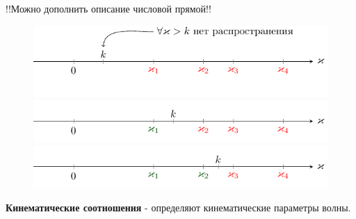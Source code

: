 !!Можно дополнить описание числовой прямой!!
\begin{figure}[h!]
\centering
\includegraphics[scale=1]{img/lect3_ris5}
\includegraphics[scale=1]{img/lect3_ris6}
\includegraphics[scale=1]{img/lect3_ris7}
\end{figure}

\textbf{Кинематические соотношения} - определяют кинематические параметры волны.

